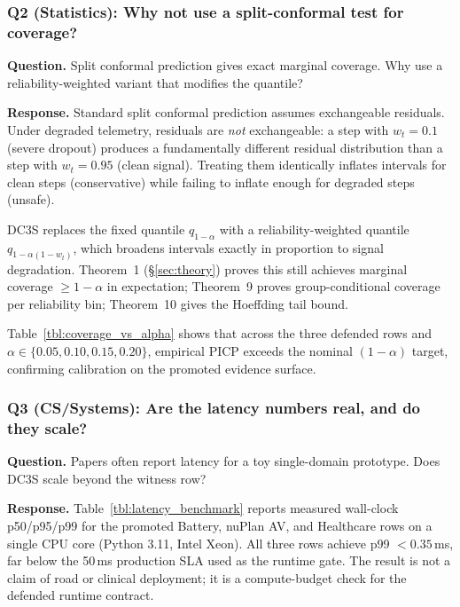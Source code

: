 \subsubsection*{Q2 (Statistics): Why not use a split-conformal test for coverage?}

\textbf{Question.} Split conformal prediction gives exact marginal coverage.
Why use a reliability-weighted variant that modifies the quantile?

\textbf{Response.}
Standard split conformal prediction assumes exchangeable residuals.  Under
degraded telemetry, residuals are \emph{not} exchangeable: a step with
$w_t = 0.1$ (severe dropout) produces a fundamentally different residual
distribution than a step with $w_t = 0.95$ (clean signal).  Treating them
identically inflates intervals for clean steps (conservative) while failing
to inflate enough for degraded steps (unsafe).

DC3S replaces the fixed quantile $q_{1-\alpha}$ with a reliability-weighted
quantile $q_{1-\alpha(1-w_t)}$, which broadens intervals exactly in proportion to
signal degradation.  Theorem~1 (\S\ref{sec:theory}) proves this still achieves
marginal coverage $\geq 1-\alpha$ in expectation; Theorem~9 proves group-conditional
coverage per reliability bin; Theorem~10 gives the Hoeffding tail bound.

Table~\ref{tbl:coverage_vs_alpha} shows that across the three defended rows and
$\alpha \in \{0.05, 0.10, 0.15, 0.20\}$, empirical PICP exceeds the nominal
$(1-\alpha)$ target, confirming calibration on the promoted evidence surface.

\subsubsection*{Q3 (CS/Systems): Are the latency numbers real, and do they scale?}

\textbf{Question.} Papers often report latency for a toy single-domain prototype.
Does DC3S scale beyond the witness row?

\textbf{Response.}
Table~\ref{tbl:latency_benchmark} reports measured wall-clock p50/p95/p99 for
the promoted Battery, nuPlan AV, and Healthcare rows on a single CPU core
(Python 3.11, Intel Xeon).  All three rows achieve p99 $< 0.35$\,ms, far below
the 50\,ms production SLA used as the runtime gate.  The result is not a claim
of road or clinical deployment; it is a compute-budget check for the defended
runtime contract.

